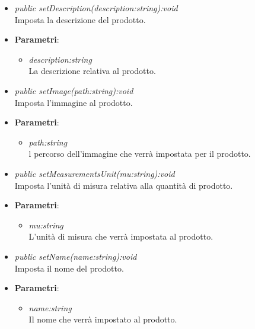 \begin{itemize}
\begin{itemize}
{\begin{itemize}
			\end{itemize}}
	\item \textit{public setDescription(description:string):void}\\
	Imposta la descrizione del prodotto.
				\item{\textbf{Parametri}: \begin{itemize}
				\item \textit{description:string}\\
				La descrizione relativa al prodotto.
			\end{itemize}}
	\item \textit{public setImage(path:string):void}\\
	Imposta l'immagine al prodotto.
				\item{\textbf{Parametri}: \begin{itemize}
				\item \textit{path:string}\\
				l percorso dell'immagine che verrà impostata per il prodotto.
			\end{itemize}}
	\item \textit{public setMeasurementsUnit(mu:string):void}\\
	Imposta l'unità di misura relativa alla quantità di prodotto.
				\item{\textbf{Parametri}: \begin{itemize}
				\item \textit{mu:string}\\
				L'unità di misura che verrà impostata al prodotto.
			\end{itemize}}
	\item \textit{public setName(name:string):void}\\
	Imposta il nome del prodotto.
				\item{\textbf{Parametri}: \begin{itemize}
				\item \textit{name:string}\\
				Il nome che verrà impostato al prodotto.
			\end{itemize}}


\end{itemize}
\end{itemize}
